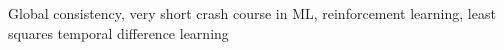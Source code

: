 Global consistency, very short crash course in ML, reinforcement learning, least squares temporal difference learning
